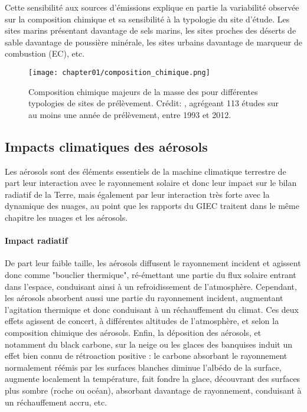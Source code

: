 Cette sensibilité aux sources d'émissions explique en partie la variabilité observée sur
la composition chimique et sa sensibilité à la typologie du site d'étude. Les sites
marins présentant davantage de sels marins, les sites proches des déserts de sable
davantage de poussière minérale, les sites urbains davantage de marqueur de combustion
(EC), etc.

\begin{figure}[htpb]
    \centering
    \texttt{[image: chapter01/composition\_chimique.png]}
    \caption{Composition chimique majeurs de la masse des \PMdix{} pour différentes
        typologies de sites de prélèvement. Crédit: \cite[figure 7.13]{boucherClouds2013},
        agrégeant 113 études sur au moins une année de prélèvement, entre 1993 et 2012.}%
    \label{fig:chapter01/composition_chimique}
\end{figure}

\subsection{Impacts climatiques des aérosols}%
\label{sub:impacts_climatiques_des_aerosols}

Les aérosols sont des éléments essentiels de la machine climatique terrestre de part leur
interaction avec le rayonnement solaire et donc leur impact sur le bilan radiatif de la
Terre, mais également par leur interaction très forte avec la dynamique des nuages, au
point que les rapports du GIEC traitent dans le même chapitre les nuages et les aérosols.

\paragraph{Impact radiatif}%
\label{par:impact_radiatif}

De part leur faible taille, les aérosols diffusent le rayonnement incident et agissent donc
comme "bouclier thermique", ré-émettant une partie du flux solaire entrant dans l'espace,
conduisant ainsi à un refroidissement de l'atmosphère.
Cependant, les aérosols absorbent aussi une partie du rayonnement incident, augmentant
l'agitation thermique et donc conduisant à un réchauffement du climat.
Ces deux effets agissent de concert, à différentes altitudes de l'atmosphère, et selon la
composition chimique des aérosols.
Enfin, la déposition des aérosols, et notamment du black carbone, sur la neige ou les
glaces des banquises induit un effet bien connu de rétroaction positive : le carbone
absorbant le rayonnement normalement réémis par les surfaces blanches diminue l'albédo de
la surface, augmente localement la température, fait fondre la glace, découvrant des
surfaces plus sombre (roche ou océan), absorbant davantage de rayonnement, conduisant à
un réchauffement accru, etc.

